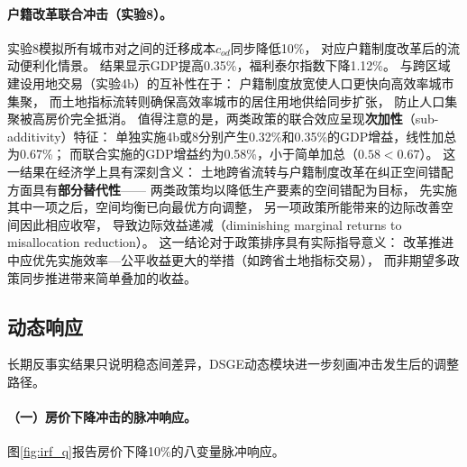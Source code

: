 \documentclass[UTF8,a4paper,12pt]{ctexart}
\theoremstyle{plain}
\theoremstyle{definition}
\theoremstyle{remark}
\begin{document}
\paragraph{户籍改革联合冲击（实验8）。}
实验8模拟所有城市对之间的迁移成本$c_{od}$同步降低10\%，
对应户籍制度改革后的流动便利化情景。
结果显示GDP提高0.35\%，福利泰尔指数下降1.12\%。
与跨区域建设用地交易（实验4b）的互补性在于：
户籍制度放宽使人口更快向高效率城市集聚，
而土地指标流转则确保高效率城市的居住用地供给同步扩张，
防止人口集聚被高房价完全抵消。
值得注意的是，两类政策的联合效应呈现\textbf{次加性}（sub-additivity）特征：
单独实施4b或8分别产生0.32\%和0.35\%的GDP增益，线性加总为0.67\%；
而联合实施的GDP增益约为0.58\%，小于简单加总（$0.58 < 0.67$）。
这一结果在经济学上具有深刻含义：
土地跨省流转与户籍制度改革在纠正空间错配方面具有\textbf{部分替代性}——
两类政策均以降低生产要素的空间错配为目标，
先实施其中一项之后，空间均衡已向最优方向调整，
另一项政策所能带来的边际改善空间因此相应收窄，
导致边际效益递减（diminishing marginal returns to misallocation reduction）。
这一结论对于政策排序具有实际指导意义：
改革推进中应优先实施效率—公平收益更大的举措（如跨省土地指标交易），
而非期望多政策同步推进带来简单叠加的收益。

\subsection{动态响应}

长期反事实结果只说明稳态间差异，DSGE动态模块进一步刻画冲击发生后的调整路径。

\paragraph{（一）房价下降冲击的脉冲响应。}

图\ref{fig:irf_q}报告房价下降10\%的八变量脉冲响应。
\end{document}

